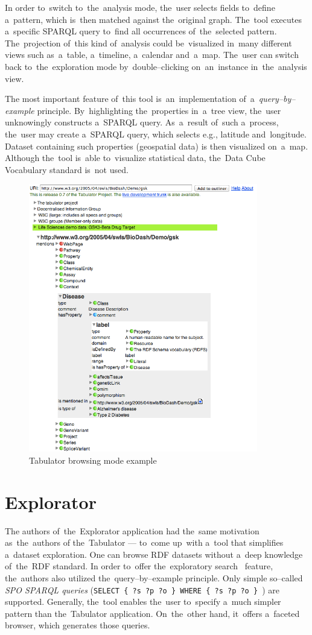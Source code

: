In order to~switch to~the~analysis mode, the~user selects fields to~define a~pattern, which is~then matched against the~original graph. The~tool executes a~specific SPARQL query to~find all occurrences of~the~selected pattern. The~projection of~this kind of~analysis could be~visualized in~many different 
views such as~a~table, a~timeline, a~calendar and~a~map. The~user can switch back to~the~exploration mode by~double--clicking on~an~instance in~the~analysis view.

The most important feature of~this tool is~an~implementation of~a~\emph{query--by--example} principle. By~highlighting the~properties in~a~tree view, the~user 
unknowingly constructs a~SPARQL query. As~a~result of~such a~process, the~user may create a~SPARQL query, which selects e.g., 
latitude and~longitude. Dataset containing such properties (geospatial data)
is then visualized on~a~map. Although the~tool is~able to~visualize statistical 
data, the~Data Cube Vocabulary standard is~not used.


\begin{figure}
	\centering
	\includegraphics[width=100mm]{img/tabulator.png}
	\caption{Tabulator browsing mode example}
	\label{fig:tabulator}
\end{figure}


\section{Explorator}
\label{sec:rw:explorator}
The authors of~the~Explorator application had the~same motivation as~the~authors 
of the~Tabulator --- to~come up~with a~tool that simplifies a~dataset 
exploration. One can browse RDF datasets without a~deep knowledge of~the~RDF standard.
In order to~offer the~exploratory search~\cite{exploratory-search} feature, the~authors also
utilized the~query--by--example principle. Only simple so--called \emph{SPO SPARQL 
queries} (\texttt{SELECT \{ ?s ?p ?o \} WHERE \{ ?s ?p ?o \} }) are supported. Generally, the~tool 
enables the~user to~specify a~much simpler pattern than the~Tabulator 
application. On~the~other hand, it~offers a~faceted browser, which generates 
those queries.

